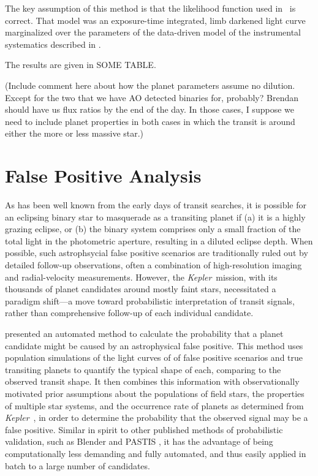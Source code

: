 \documentclass{emulateapj}
\newcommand{\project}[1]{\textsl{#1}}
\newcommand{\kep}{\project{Kepler}}
\newcommand{\paperit}{\citet{Foreman-Mackey15}}
\begin{document}
The key assumption of this method is that the likelihood function used in
\paperit\ is correct.
That model was an exposure-time integrated, limb darkened light curve
\citep{Mandel02,Kipping10b} marginalized over the parameters of the
data-driven model of the instrumental systematics described in \paperit.

The results are given in SOME TABLE.


(Include comment here about how the planet parameters assume no dilution.
Except for the two that we have AO detected binaries for, probably?
Brendan should have us flux ratios by the end of the day.
In those cases, I suppose we need to include planet properties in both cases
in which the transit is around either the more or less massive star.)

\section{False Positive Analysis}
As has been well known from the early days of transit searches, it is
possible for an eclipsing binary star to masquerade as a transiting
planet if (a) it is a highly grazing eclipse, or (b) the binary system
comprises only a small fraction of the total light in the photometric
aperture, resulting in a diluted eclipse depth.
When possible, such astrophsycial false positive scenarios are traditionally
ruled out by detailed follow-up observations, often a combination of 
high-resolution imaging and radial-velocity measurements.
However, the \kep\ mission, with its thousands of planet candidates
around mostly faint stars, necessitated a paradigm shift---a move
toward probabilistic interpretation of transit signals, rather than
comprehensive follow-up of each individual candidate.

\citet{Morton12} presented an automated method to calculate the
probability that a planet candidate might be caused by an
astrophysical false positive.
This method uses population simulations of the light curves of
of false positive scenarios and true transiting planets to quantify
the typical shape of each, comparing to the observed transit shape.
It then combines this information with observationally motivated prior
assumptions about the populations of field stars, the properties of
multiple star systems, and the occurrence rate of planets as determined
from \kep\ \citep{Fressin13}, in order to determine the probability that
the observed signal may be a false positive.
Similar in spirit to other published methods of
probabilistic validation, such as Blender \citep{} and PASTIS
\citep{}, it has the advantage of being computationally less demanding
and fully automated, and thus easily applied in batch to a large
number of candidates.
\end{document}
